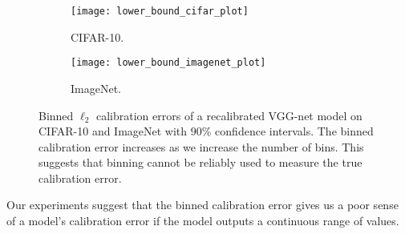 \begin{figure}
     \centering
     \begin{subfigure}[b]{0.4\textwidth}
         \centering
         \texttt{[image: lower\_bound\_cifar\_plot]}
         \caption{CIFAR-10.}
         \label{fig:cifat_10_lower_bound}
     \end{subfigure}
     \hfill
     \begin{subfigure}[b]{0.4\textwidth}
         \centering
         \texttt{[image: lower\_bound\_imagenet\_plot]}
         \caption{ImageNet.}
         \label{fig:imagenet_lower_bound}
     \end{subfigure}
        \caption{
        Binned $\ell_2$ calibration errors of a recalibrated VGG-net model on CIFAR-10 and ImageNet with $90\%$ confidence intervals. The binned calibration error increases as we increase the number of bins. This suggests that binning cannot be reliably used to measure the true calibration error.
        }
        \label{fig:lower_bounds}
\end{figure}


Our experiments suggest that the binned calibration error gives us a poor sense of a model's calibration error if the model outputs a continuous range of values.




